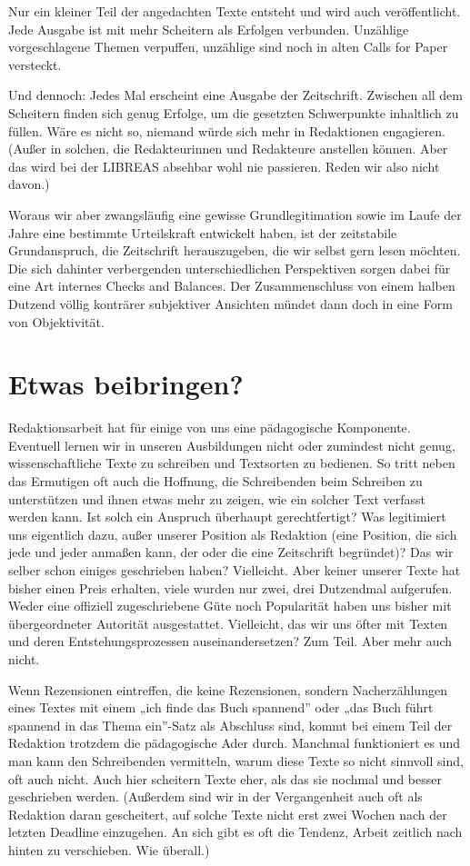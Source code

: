 \documentclass[output=paper]{langscibook}
\begin{document}
Nur ein kleiner Teil der angedachten Texte entsteht und wird auch veröffentlicht. Jede Ausgabe ist mit mehr Scheitern als Erfolgen verbunden. Unzählige vorgeschlagene Themen verpuffen, unzählige sind noch in alten Calls for Paper versteckt.

Und dennoch: Jedes Mal erscheint eine Ausgabe der Zeitschrift. Zwischen all dem Scheitern finden sich genug Erfolge, um die gesetzten Schwerpunkte inhaltlich zu füllen. Wäre es nicht so, niemand würde sich mehr in Redaktionen engagieren. (Außer in solchen, die Redakteurinnen und Redakteure anstellen können. Aber das wird bei der LIBREAS absehbar wohl nie passieren. Reden wir also nicht davon.)

Woraus wir aber zwangsläufig eine gewisse Grundlegitimation sowie im Laufe der Jahre eine bestimmte Urteilskraft entwickelt haben, ist der zeitstabile Grundanspruch, die Zeitschrift herauszugeben, die wir selbst gern lesen möchten. Die sich dahinter verbergenden unterschiedlichen Perspektiven sorgen dabei für eine Art internes Checks and Balances. Der Zusammenschluss von einem halben Dutzend völlig konträrer subjektiver Ansichten mündet dann doch in eine Form von Objektivität.

\section*{Etwas beibringen?}\label{Etwas beibringen?} 

Redaktionsarbeit hat für einige von uns eine pädagogische Komponente. Eventuell lernen wir in unseren Ausbildungen nicht oder zumindest nicht genug, wissenschaftliche Texte zu schreiben und Textsorten zu bedienen. So tritt neben das Ermutigen oft auch die Hoffnung, die Schreibenden beim Schreiben zu unterstützen und ihnen etwas mehr zu zeigen, wie ein solcher Text verfasst werden kann. Ist solch ein Anspruch überhaupt gerechtfertigt? Was legitimiert uns eigentlich dazu, außer unserer Position als Redaktion (eine Position, die sich jede und jeder anmaßen kann, der oder die eine Zeitschrift begründet)? Das wir selber schon einiges geschrieben haben? Vielleicht. Aber keiner unserer Texte hat bisher einen Preis erhalten, viele wurden nur zwei, drei Dutzendmal aufgerufen. Weder eine offiziell zugeschriebene Güte noch Popularität haben uns bisher mit übergeordneter Autorität ausgestattet. Vielleicht, das wir uns öfter mit Texten und deren Entstehungsprozessen auseinandersetzen? Zum Teil. Aber mehr auch nicht.

Wenn Rezensionen eintreffen, die keine Rezensionen, sondern Nacherzählungen eines Textes mit einem „ich finde das Buch spannend” oder „das Buch führt spannend in das Thema ein”-Satz als Abschluss sind, kommt bei einem Teil der Redaktion trotzdem die pädagogische Ader durch. Manchmal funktioniert es und man kann den Schreibenden vermitteln, warum diese Texte so nicht sinnvoll sind, oft auch nicht. Auch hier scheitern Texte eher, als das sie nochmal und besser geschrieben werden. (Außerdem sind wir in der Vergangenheit auch oft als Redaktion daran gescheitert, auf solche Texte nicht erst zwei Wochen nach der letzten Deadline einzugehen. An sich gibt es oft die Tendenz, Arbeit zeitlich nach hinten zu verschieben. Wie überall.)
\end{document}
